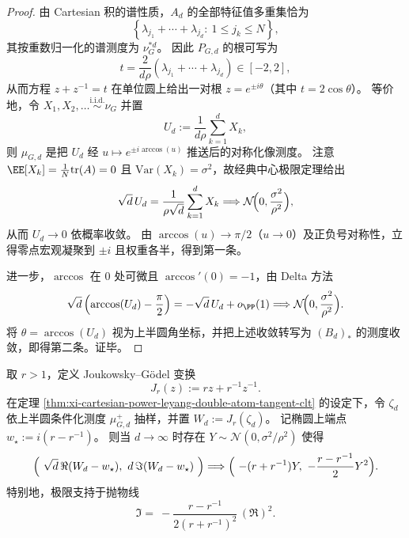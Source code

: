 \begin{proof}
由 Cartesian 积的谱性质，\(A_d\) 的全部特征值多重集恰为
\[
\left\{\lambda_{j_1}+\cdots+\lambda_{j_d}:\ 1\le j_k\le N\right\},
\]
其按重数归一化的谱测度为 \(\nu_G^{*d}\)。
因此 \(P_{G,d}\) 的根可写为
\[
t=\frac{2}{d\rho}(\lambda_{j_1}+\cdots+\lambda_{j_d})\in[-2,2],
\]
从而方程 \(z+z^{-1}=t\) 在单位圆上给出一对根 \(z=e^{\pm i\theta}\)（其中 \(t=2\cos\theta\)）。
等价地，令 \(X_1,X_2,\dots\overset{\mathrm{i.i.d.}}{\sim}\nu_G\) 并置
\[
U_d:=\frac{1}{d\rho}\sum_{k=1}^{d}X_k,
\]
则 \(\mu_{G,d}\) 是把 \(U_d\) 经 \(u\mapsto e^{\pm i\arccos(u)}\) 推送后的对称化像测度。
注意 \(\EE[X_k]=\tfrac1N\mathrm{tr}(A)=0\) 且 \(\mathrm{Var}(X_k)=\sigma^2\)，故经典中心极限定理给出
\[
\sqrt d\,U_d=\frac{1}{\rho\sqrt d}\sum_{k=1}^{d}X_k
\Longrightarrow
\mathcal N\!\Bigl(0,\frac{\sigma^2}{\rho^2}\Bigr),
\]
从而 \(U_d\to 0\) 依概率收敛。
由 \(\arccos(u)\to \pi/2\)（\(u\to 0\)）及正负号对称性，立得零点宏观凝聚到 \(\pm i\) 且权重各半，得到第一条。
\par
进一步，\(\arccos\) 在 \(0\) 处可微且 \(\arccos'(0)=-1\)，由 Delta 方法
\[
\sqrt d\left(\arccos(U_d)-\frac{\pi}{2}\right)
=-\sqrt d\,U_d+o_{\PP}(1)
\Longrightarrow
\mathcal N\!\Bigl(0,\frac{\sigma^2}{\rho^2}\Bigr).
\]
将 \(\theta=\arccos(U_d)\) 视为上半圆角坐标，并把上述收敛转写为 \((B_d)_*\) 的测度收敛，即得第二条。证毕。
\end{proof}

\begin{theorem}\label{thm:xi-cartesian-power-joukowsky-godel-anisotropic-parabola}
取 \(r>1\)，定义 Joukowsky--Gödel 变换
\[
J_r(z):=rz+r^{-1}z^{-1}.
\]
在定理 \ref{thm:xi-cartesian-power-leyang-double-atom-tangent-clt} 的设定下，令 \(\zeta_d\) 依上半圆条件化测度 \(\mu_{G,d}^{+}\) 抽样，并置 \(W_d:=J_r(\zeta_d)\)。
记椭圆上端点 \(w_\star:=i(r-r^{-1})\)。
则当 \(d\to\infty\) 时存在 \(Y\sim\mathcal N(0,\sigma^2/\rho^2)\) 使得
\[
\Bigl(\ \sqrt d\,\Re(W_d-w_\star),\ d\,\Im(W_d-w_\star)\ \Bigr)
\Longrightarrow
\Bigl(\ -(r+r^{-1})Y,\ -\frac{r-r^{-1}}{2}Y^2\Bigr).
\]
特别地，极限支持于抛物线
\[
\Im=\ -\frac{r-r^{-1}}{2(r+r^{-1})^2}\,(\Re)^2.
\]
\end{theorem}


